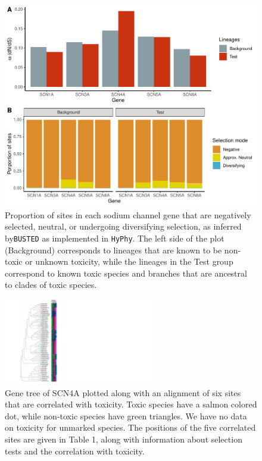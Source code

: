 \documentclass{article}
\begin{document}
\begin{figure}[h!]
    \centering
    \includegraphics[width=\textwidth]{figures/Fig2_selection.pdf}
    \caption{Proportion of sites in each sodium channel gene that are negatively selected, neutral, or undergoing diversifying selection, as inferred by\texttt{BUSTED} as implemented in \texttt{HyPhy}. The left side of the plot (Background) corresponds to lineages that are known to be non-toxic or unknown toxicity, while the lineages in the Test group correspond to known toxic species and branches that are ancestral to clades of toxic species.}
    \label{fig:my_label}
\end{figure}
\clearpage

\begin{figure}[h!]
    \centering
    \includegraphics[width=0.6\textwidth]{figures/SCN4A.corrTree.trimmed.pdf}
    \caption{Gene tree of SCN4A plotted along with an alignment of six sites that are correlated with toxicity. Toxic species have a salmon colored dot, while non-toxic species have green triangles. We have no data on toxicity for unmarked species. The positions of the five correlated sites are given in Table 1, along with information about selection tests and the correlation with toxicity.}
    \label{fig:my_label}
\end{figure}
\clearpage
\end{document}
